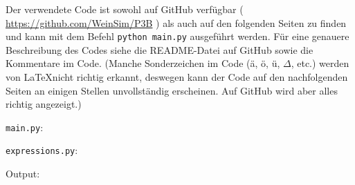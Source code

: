 \documentclass{article}
\newcommand{\githuburl}{
    \url{https://github.com/WeinSim/P3B}
}
\begin{document}
Der verwendete Code ist sowohl auf GitHub verfügbar (\githuburl) als auch auf den
folgenden Seiten zu finden und kann mit dem Befehl \texttt{python main.py}
ausgeführt werden. Für eine genauere Beschreibung des Codes siehe die README-Datei
auf GitHub sowie die Kommentare im Code.
(Manche Sonderzeichen im Code (ä, ö, ü, $\Delta$, etc.) werden von \LaTeX nicht
richtig erkannt, deswegen kann der Code auf den nachfolgenden Seiten an einigen
Stellen unvollständig erscheinen. Auf GitHub wird aber alles richtig angezeigt.)

\newpage


\verb|main.py|:

\newpage

\verb|expressions.py|:

\newpage

Output:

\end{document}
